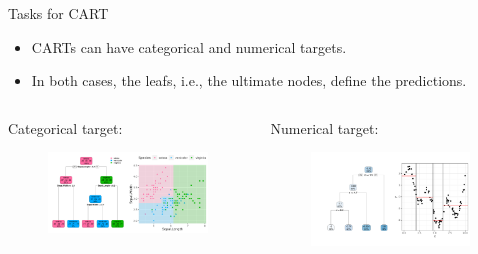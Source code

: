 \documentclass[11pt,compress,t,notes=noshow, xcolor=table]{beamer}
\begin{document}
\begin{vbframe}{Tasks for CART}
  \begin{itemize}

    \item CARTs can have categorical and numerical targets.
    \item In both cases, the leafs, i.e., the ultimate nodes, define the predictions.
  \end{itemize}
  
  \begin{columns}
\begin{column}{0.48\textwidth}
  
  Categorical target:
    \begin{figure}
    \centering
\includegraphics[width=0.99\textwidth, keepaspectratio]{figure/tree-classif-depth3.pdf}
    \end{figure}
\end{column}
\begin{column}{0.48\textwidth}
  
  Numerical target:
    \begin{figure}
    \centering
\includegraphics[width=0.99\textwidth, keepaspectratio]{figure/tree-regr-depth3.pdf}
    \end{figure}
\end{column}
\end{columns}
  
\end{vbframe}
\end{document}
